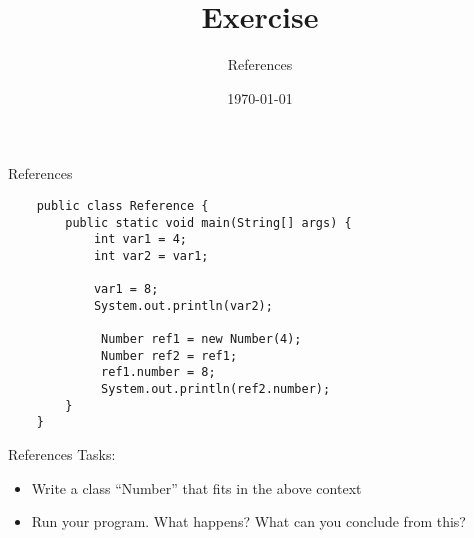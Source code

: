 


\title{Exercise}
\subtitle{References}
\date{\today}




\begin{frame}
    \titlepage
\end{frame}

\begin{frame}[fragile]{References}
   \begin{lstlisting}
    public class Reference {
        public static void main(String[] args) {
            int var1 = 4;
            int var2 = var1;

            var1 = 8;
            System.out.println(var2);
        
             Number ref1 = new Number(4);    
             Number ref2 = ref1;
             ref1.number = 8;
             System.out.println(ref2.number);
        }
    }\end{lstlisting}
\end{frame}

\begin{frame}{References}
    Tasks:
    \begin{itemize}
        \item Write a class ``Number'' that fits in the above context
        \item Run your program. What happens? What can you conclude from this?
    \end{itemize}
\end{frame}



